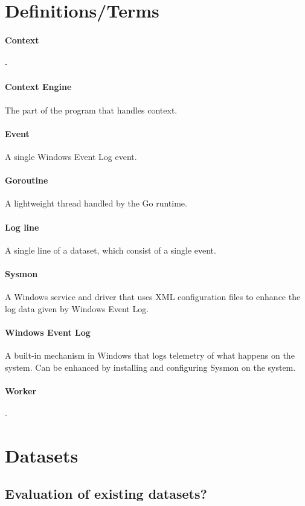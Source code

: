\chapter{Definitions/Terms}
\label{chap:definitions}

\subsubsection{Context} -
\subsubsection{Context Engine} The part of the program that handles context.
\subsubsection{Event} A single Windows Event Log event.
\subsubsection{Goroutine} A lightweight thread handled by the Go runtime.
\subsubsection{Log line} A single line of a dataset, which consist of a single event.
\subsubsection{Sysmon} A Windows service and driver that uses XML configuration files to enhance the log data given by Windows Event Log.
\subsubsection{Windows Event Log} A built-in mechanism in Windows that logs telemetry of what happens on the system. Can be enhanced by installing and configuring Sysmon on the system.
\subsubsection{Worker} -

\chapter{Datasets}
\label{chap:datasets}

\section{Evaluation of existing datasets?}

